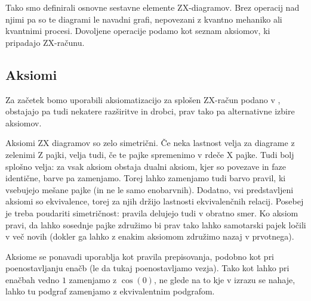 \documentclass[mat1]{fmfdelo}
\begin{document}
Tako smo definirali osnovne sestavne elemente ZX-diagramov. Brez operacij nad njimi pa so te diagrami le navadni grafi, nepovezani z kvantno mehaniko ali kvantnimi procesi. Dovoljene operacije podamo kot seznam aksiomov, ki pripadajo ZX-računu.
\subsection{Aksiomi}
Za začetek bomo uporabili aksiomatizacijo za splošen ZX-račun podano v \cite[poglavje 2.2]{vilmart}, obstajajo pa tudi nekatere razširitve in drobci, prav tako pa alternativne izbire aksiomov.

Aksiomi ZX diagramov so zelo simetrični. Če neka lastnost velja za diagrame z zelenimi Z pajki, velja tudi, če te pajke spremenimo v rdeče X pajke. Tudi bolj splošno velja: za vsak aksiom obstaja dualni aksiom, kjer so povezave in faze identične, barve pa zamenjamo. Torej lahko zamenjamo tudi barvo pravil, ki vsebujejo mešane pajke (in ne le samo enobarvnih). Dodatno, vsi predstavljeni aksiomi so ekvivalence, torej za njih držijo lastnosti ekvivalenčnih relacij. Posebej je treba poudariti simetričnost: pravila delujejo tudi v obratno smer. Ko aksiom pravi, da lahko sosednje pajke združimo bi prav tako lahko samotarski pajek ločili v več novih (dokler ga lahko z enakim aksiomom združimo nazaj v prvotnega).

Aksiome se ponavadi uporablja kot pravila prepisovanja, podobno kot pri poenostavljanju enačb (le da tukaj poenostavljamo vezja). Tako kot lahko pri enačbah vedno \(1\) zamenjamo z \(\cos(0)\), ne glede na to kje v izrazu se nahaje, lahko tu podgraf zamenjamo z ekvivalentnim podgrafom.
\end{document}
